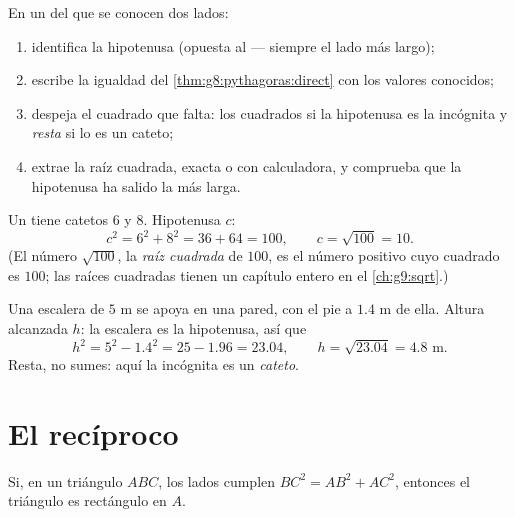 \begin{method}\label{met:g8:pythagoras:compute}
En un  del que se conocen dos lados:
\begin{enumerate}
  \item identifica la hipotenusa (opuesta al  --- siempre el
        lado más largo);
  \item escribe la igualdad del \cref{thm:g8:pythagoras:direct} con
        los valores conocidos;
  \item despeja el cuadrado que falta: \emph{} los cuadrados si la
        hipotenusa es la incógnita y \emph{resta} si lo es un cateto;
  \item extrae la raíz cuadrada, exacta o con calculadora, y comprueba
        que la hipotenusa ha salido la más larga.
\end{enumerate}
\end{method}

\begin{example}\label{ex:g8:pythagoras:hypotenuse}
Un  tiene catetos $6$ y $8$. Hipotenusa $c$:
\[
c^2 = 6^2 + 8^2 = 36 + 64 = 100,
\qquad
c = \sqrt{100} = 10 .
\]
(El número $\sqrt{100}$, la \emph{raíz cuadrada} de $100$, es el
número positivo cuyo cuadrado es $100$; las raíces cuadradas tienen un capítulo
entero en el \cref{ch:g9:sqrt}.)
\end{example}

\begin{example}\label{ex:g8:pythagoras:leg}
Una escalera de $5$ m se apoya en una pared, con el pie a $1.4$ m de ella.
Altura alcanzada $h$: la escalera es la hipotenusa, así que
\[
h^2 = 5^2 - 1.4^2 = 25 - 1.96 = 23.04,
\qquad
h = \sqrt{23.04} = 4.8 \text{ m}.
\]
Resta, no sumes: aquí la incógnita es un \emph{cateto}.
\end{example}

\section{El recíproco}

\begin{theorem}\label{thm:g8:pythagoras:converse}
Si, en un triángulo $ABC$, los lados cumplen $BC^2 = AB^2 + AC^2$, entonces
el triángulo es rectángulo en $A$.
\end{theorem}
\admitted

